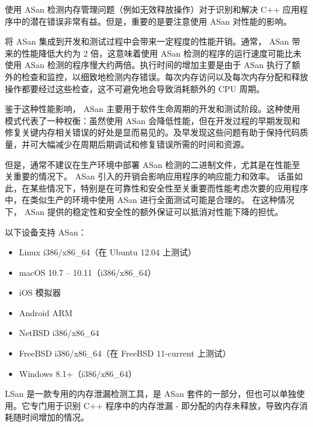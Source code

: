 使用 ASan 检测内存管理问题（例如无效释放操作）对于识别和解决 C++ 应用程序中的潜在错误非常有益。但是，重要的是要注意使用 ASan 对性能的影响。


将 ASan 集成到开发和测试过程中会带来一定程度的性能开销。通常， ASan 带来的性能降低大约为 2 倍，这意味着使用 ASan 检测的程序的运行速度可能比未使用 ASan 检测的程序慢大约两倍。执行时间的增加主要是由于 ASan 执行了额外的检查和监控，以细致地检测内存错误。每次内存访问以及每次内存分配和释放操作都要经过这些检查，这不可避免地会导致消耗额外的 CPU 周期。

鉴于这种性能影响， ASan 主要用于软件生命周期的开发和测试阶段。这种使用模式代表了一种权衡：虽然使用 ASan 会降低性能，但在开发过程的早期发现和修复关键内存相关错误的好处是显而易见的。及早发现这些问题有助于保持代码质量，并可大幅减少在周期后期调试和修复错误所需的时间和资源。

但是，通常不建议在生产环境中部署 ASan 检测的二进制文件，尤其是在性能至关重要的情况下。 ASan 引入的开销会影响应用程序的响应能力和效率。 话虽如此，在某些情况下，特别是在可靠性和安全性至关重要而性能考虑次要的应用程序中，在类似生产的环境中使用 ASan 进行全面测试可能是合理的。 在这种情况下， ASan 提供的稳定性和安全性的额外保证可以抵消对性能下降的担忧。

以下设备支持 ASan：

\begin{itemize}
\item
Linux i386/x86\_64（在 Ubuntu 12.04 上测试）

\item
macOS 10.7 – 10.11（i386/x86\_64）

\item
iOS 模拟器

\item
Android ARM

\item
NetBSD i386/x86\_64

\item
FreeBSD i386/x86\_64（在 FreeBSD 11-current 上测试）

\item
Windows 8.1+（i386/x86\_64）
\end{itemize}


LSan 是一款专用的内存泄漏检测工具，是 ASan 套件的一部分，但也可以单独使用。它专门用于识别 C++ 程序中的内存泄漏 - 即分配的内存未释放，导致内存消耗随时间增加的情况。

